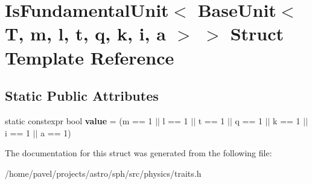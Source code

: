 \hypertarget{structIsFundamentalUnit_3_01BaseUnit_3_01T_00_01m_00_01l_00_01t_00_01q_00_01k_00_01i_00_01a_01_4_01_4}{}\section{Is\+Fundamental\+Unit$<$ Base\+Unit$<$ T, m, l, t, q, k, i, a $>$ $>$ Struct Template Reference}
\label{structIsFundamentalUnit_3_01BaseUnit_3_01T_00_01m_00_01l_00_01t_00_01q_00_01k_00_01i_00_01a_01_4_01_4}
\subsection*{Static Public Attributes}
\begin{DoxyCompactItemize}
\item 
\hypertarget{structIsFundamentalUnit_3_01BaseUnit_3_01T_00_01m_00_01l_00_01t_00_01q_00_01k_00_01i_00_01a_01_4_01_4_a7dff1558e2eb9c458847fe2554621638}{}\label{structIsFundamentalUnit_3_01BaseUnit_3_01T_00_01m_00_01l_00_01t_00_01q_00_01k_00_01i_00_01a_01_4_01_4_a7dff1558e2eb9c458847fe2554621638} 
static constexpr bool {\bfseries value} = (m == 1 $\vert$$\vert$ l == 1 $\vert$$\vert$ t == 1 $\vert$$\vert$ q == 1 $\vert$$\vert$ k == 1 $\vert$$\vert$ i == 1 $\vert$$\vert$ a == 1)
\end{DoxyCompactItemize}


The documentation for this struct was generated from the following file\+:\begin{DoxyCompactItemize}
\item 
/home/pavel/projects/astro/sph/src/physics/traits.\+h\end{DoxyCompactItemize}
